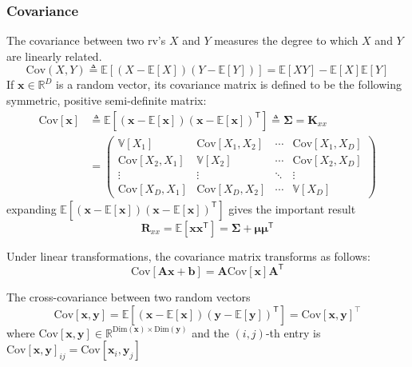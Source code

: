 \documentclass[11pt]{article}
\begin{document}
\subsubsection*{Covariance}
The covariance between two rv's $X$ and $Y$ measures the degree to which $X$ and $Y$ are linearly related.
\[
\text{Cov}(X, Y) \triangleq \mathbb{E}[(X - \mathbb{E}[X])(Y - \mathbb{E}[Y])] = \mathbb{E}[XY] - \mathbb{E}[X]\mathbb{E}[Y]
\]
If $\boldsymbol{x} \in \mathbb{R}^D$ is a random vector, its covariance matrix is defined to be the following symmetric, positive semi-definite matrix:
\[
\begin{aligned}
\text{Cov}[\boldsymbol{x}] &\triangleq \mathbb{E} \left[ (\boldsymbol{x} - \mathbb{E}[\boldsymbol{x}])(\boldsymbol{x} - \mathbb{E}[\boldsymbol{x}])^\mathsf{T} \right] \triangleq \boldsymbol{\Sigma} = \boldsymbol{K}_{xx} \\
&= \begin{pmatrix}
\mathbb{V}[X_1] & \text{Cov}[X_1, X_2] & \cdots & \text{Cov}[X_1, X_D] \\
\text{Cov}[X_2, X_1] & \mathbb{V}[X_2] & \cdots & \text{Cov}[X_2, X_D] \\
\vdots & \vdots & \ddots & \vdots \\
\text{Cov}[X_D, X_1] & \text{Cov}[X_D, X_2] & \cdots & \mathbb{V}[X_D]
\end{pmatrix}
\end{aligned}
\]
expanding $\mathbb{E} \left[ (\boldsymbol{x} - \mathbb{E}[\boldsymbol{x}])(\boldsymbol{x} - \mathbb{E}[\boldsymbol{x}])^\mathsf{T} \right]$ gives the important result
\[
\boldsymbol{R}_{xx} = \mathbb{E}[\boldsymbol{x} \boldsymbol{x}^\mathsf{T}] = \boldsymbol{\Sigma} + \boldsymbol{\mu} \boldsymbol{\mu}^\mathsf{T}
\]

Under linear transformations, the covariance matrix transforms as follows:
\[
\text{Cov}[\mathbf{A}\boldsymbol{x} + \boldsymbol{b}] = \mathbf{A} \text{Cov}[\boldsymbol{x}] \mathbf{A}^\mathsf{T}
\]

The cross-covariance between two random vectors
\[
\text{Cov}[\boldsymbol{x}, \boldsymbol{y}] = \mathbb{E}[(\boldsymbol{x} - \mathbb{E}[\boldsymbol{x}])(\boldsymbol{y} - \mathbb{E}[\boldsymbol{y}])^\mathsf{T}] = \text{Cov}[\boldsymbol{x}, \boldsymbol{y}]^\top
\]
where $\text{Cov}[\boldsymbol{x}, \boldsymbol{y}] \in \mathbb{R}^{\text{Dim}(\boldsymbol{x}) \times \text{Dim}(\boldsymbol{y})}$ and the $(i, j)$-th entry is $\text{Cov}[\boldsymbol{x}, \boldsymbol{y}]_{ij} = \text{Cov}[\boldsymbol{x}_i, \boldsymbol{y}_j]$
\end{document}
